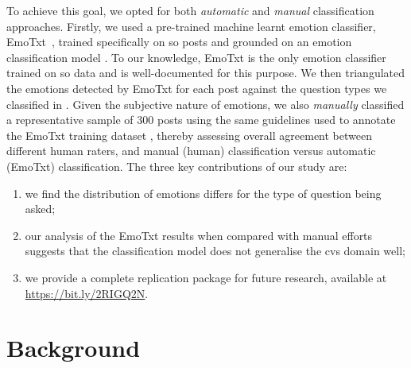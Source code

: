 To achieve this goal, we opted for both \textit{automatic} and \textit{manual} classification approaches. Firstly, we used a pre-trained machine learnt emotion classifier, EmoTxt~\citep{novielli2018, calefato2018, calefato2017}, trained specifically on \gls{so} posts and grounded on an emotion classification model \citep{shaver1987}. To our knowledge, EmoTxt is the only emotion classifier trained on \gls{so} data and is well-documented for this purpose. We then triangulated the emotions detected by EmoTxt for each post against the question types we classified in \citep{Cummaudo:2020icse}. Given the subjective nature of emotions, we also \textit{manually} classified a representative sample of 300 posts using the same guidelines used to annotate the EmoTxt training dataset \citep{novielli2018}, thereby assessing overall agreement between different human raters, and manual (human) classification versus automatic (EmoTxt) classification. The three key contributions of our study are: 
\begin{enumerate}[label=(\roman*)]
    \item we find the distribution of emotions differs for the type of question being asked; 
    \item our analysis of the EmoTxt results when compared with manual efforts suggests that the classification model does not generalise the \gls{cvs} domain well; 
    \item we provide a complete replication package for future research, available at \url{https://bit.ly/2RIGQ2N}.
\end{enumerate}


\section{Background}\label{semotion2021:sec:emotion-mining}



